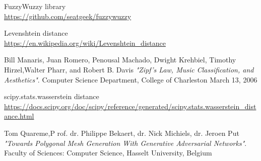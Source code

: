 \documentclass[a4paper]{article}
\begin{document}
\begin{thebibliography}{9}
FuzzyWuzzy library
\\\url{https://github.com/seatgeek/fuzzywuzzy}

Levenshtein distance
\\\url{https://en.wikipedia.org/wiki/Levenshtein_distance}



Bill Manaris, Juan Romero, Penousal Machado, Dwight Krehbiel, Timothy Hirzel,Walter Pharr, and Robert B. Davis
\textit{"Zipf's Law, Music Classification, and Aesthetics"}. 
Computer Science Department, College of Charleston
March 13, 2006


scipy.stats.wasserstein distance
\\\url{https://docs.scipy.org/doc/scipy/reference/generated/scipy.stats.wasserstein_distance.html}


Tom Quareme,P rof. dr. Philippe Bekaert, dr. Nick Michiels, dr. Jeroen Put
\textit{"Towards Polygonal Mesh Generation With Generative Adversarial Networks"}. 
Faculty of Sciences: Computer Science, Hasselt University, Belgium




\end{thebibliography}
\end{document}
